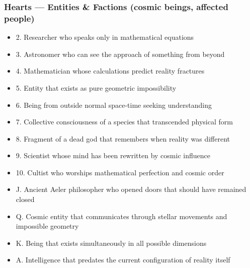 \documentclass[11pt]{article}
\begin{document}
\subsubsection{Hearts — Entities \& Factions (cosmic beings, affected people)}
\begin{itemize}[leftmargin=*]
\item 2. Researcher who speaks only in mathematical equations
\item 3. Astronomer who can see the approach of something from beyond
\item 4. Mathematician whose calculations predict reality fractures
\item 5. Entity that exists as pure geometric impossibility
\item 6. Being from outside normal space-time seeking understanding
\item 7. Collective consciousness of a species that transcended physical form
\item 8. Fragment of a dead god that remembers when reality was different
\item 9. Scientist whose mind has been rewritten by cosmic influence
\item 10. Cultist who worships mathematical perfection and cosmic order
\item J. Ancient Aeler philosopher who opened doors that should have remained closed
\item Q. Cosmic entity that communicates through stellar movements and impossible geometry
\item K. Being that exists simultaneously in all possible dimensions
\item A. Intelligence that predates the current configuration of reality itself
\end{itemize}
\end{document}

